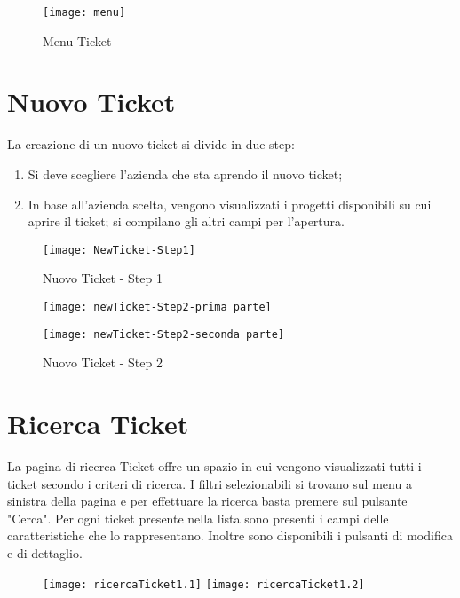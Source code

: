 \begin{figure}[H]
	\centering
    \texttt{[image: menu]} 
    \caption{Menu Ticket}
\end{figure}

\newpage

\section{Nuovo Ticket}
La creazione di un nuovo ticket si divide in due step:
\begin{enumerate}
\item Si deve scegliere l'azienda che sta aprendo il nuovo ticket;
\item In base all'azienda scelta, vengono visualizzati i progetti disponibili su cui aprire il ticket; si compilano gli altri campi per l'apertura.
\end{enumerate}

 
\begin{figure}[H]
\bigskip
	\centering
    \texttt{[image: NewTicket-Step1]} 
    \caption{Nuovo Ticket - Step 1}
\end{figure}

\begin{figure}[H]
\bigskip
	\centering
	
    \texttt{[image: newTicket-Step2-prima parte]} 
\end{figure}

\begin{figure}[H]
\bigskip
	\centering

        \texttt{[image: newTicket-Step2-seconda parte]} 
    \caption{Nuovo Ticket - Step 2}
\end{figure}

\bigskip
\section{Ricerca Ticket}
La pagina di ricerca Ticket offre un spazio in cui vengono visualizzati tutti i ticket secondo i criteri di ricerca. I filtri selezionabili si trovano sul menu a sinistra della pagina e per effettuare la ricerca basta premere sul pulsante "Cerca". Per ogni ticket presente nella lista sono presenti i campi delle caratteristiche che lo rappresentano. Inoltre sono disponibili i pulsanti di modifica e di dettaglio.

\begin{figure}[H]
\bigskip
	\centering
    \texttt{[image: ricercaTicket1.1]} 
        \texttt{[image: ricercaTicket1.2]} 
\end{figure}

